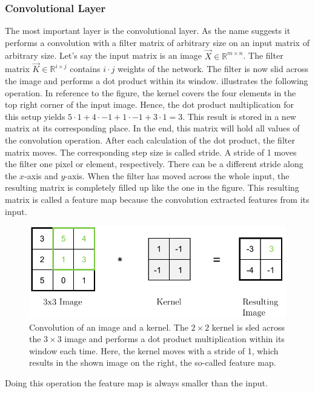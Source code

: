 \subsubsection{Convolutional Layer}
\label{sec:cnn-convolutional-layer}
The most important layer is the convolutional layer.
As the name suggests it performs a convolution with a filter matrix of arbitrary size on an input matrix of arbitrary size.
Let's say the input matrix is an image $\vec{X} \in \mathbb{R}^{m \times n}$.
The filter matrix $\vec{K} \in \mathbb{R}^{i \times j}$ contains $i \cdot j$ weights of the network.
The filter is now slid across the image and performs a dot product within its window.
 illustrates the following operation.
In reference to the figure, the kernel covers the four elements in the top right corner of the input image.
Hence, the dot product multiplication for this setup yields $5 \cdot 1+4 \cdot -1+1 \cdot -1+3 \cdot 1=3$.
This result is stored in a new matrix at its corresponding place.
In the end, this matrix will hold all values of the convolution operation.
After each calculation of the dot product, the filter matrix moves.
The corresponding step size is called stride.
A stride of 1 moves the filter one pixel or element, respectively.
There can be a different stride along the $x$-axis and $y$-axis.
When the filter has moved across the whole input, the resulting matrix is completely filled up like the one in the figure.
This resulting matrix is called a feature map because the convolution extracted features from its input.
\begin{figure}
	\centering
	\includegraphics{images/convolution.pdf}
	\caption[Convolution of an image with a kernel]{Convolution of an image and a kernel. The $2 \times 2$ kernel is sled across the $3 \times 3$ image and performs a dot product multiplication within its window each time. Here, the kernel moves with a stride of 1, which results in the shown image on the right, the so-called feature map.}
	\label{fig:convolution}
\end{figure}
Doing this operation the feature map is always smaller than the input.
